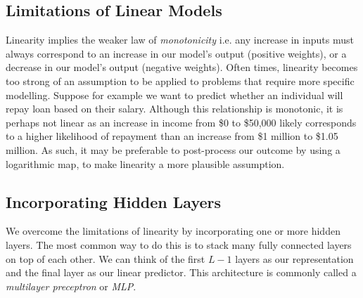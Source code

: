 \documentclass[a4paper,12pt]{article}
\theoremstyle{definition}
\begin{document}
    \subsection*{Limitations of Linear Models}
    Linearity implies the weaker law of \textit{monotonicity} i.e. any increase in inputs must always correspond to an increase in our model's 
    output (positive weights), or a decrease in our model's output (negative weights). Often times, linearity becomes too strong of an assumption
    to be applied to problems that require more specific modelling. Suppose for example we want to predict whether an individual will repay loan
    based on their salary. Although this relationship is monotonic, it is perhaps not linear as an increase in income from \$0 to \$50,000 likely
    corresponds to a higher likelihood of repayment than an increase from \$1 million to \$1.05 million. As such, it may be preferable to
    post-process our outcome by using a logarithmic map, to make linearity a more plausible assumption.
    \subsection*{Incorporating Hidden Layers}
    We overcome the limitations of linearity by incorporating one or more hidden layers. The most common way to do this is to stack many fully
    connected layers on top of each other. We can think of the first $L-1$ layers as our representation and the final layer as our linear predictor.
    This architecture is commonly called a \textit{multilayer preceptron} or \textit{MLP}.
\end{document}

